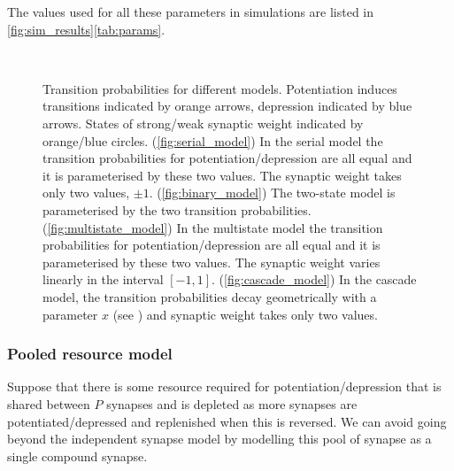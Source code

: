 \documentclass[10pt]{article}
\begin{document}
The values used for all these parameters in simulations are listed in \autoref{fig:sim_results}\ref{tab:params}.

\begin{figure}
 \begin{center}
 \parbox{0.8\linewidth}{%
 \begin{myenuma}
  \item{}\label{fig:serial_model}\hspace{0.5cm}
  \item{}\label{fig:binary_model}\hspace{0.5cm}\\[1cm]
  \item{}\label{fig:multistate_model}\hspace{0.5cm}
  \item{}\label{fig:cascade_model}
 \end{myenuma}
 }
 \end{center}
  \caption[Transition probabilities for different models]{Transition probabilities for different models.
  Potentiation induces transitions indicated by orange arrows, depression indicated by blue arrows.
  States of strong/weak synaptic weight indicated by orange/blue circles.
  (\ref{fig:serial_model}) In the serial model the transition probabilities for potentiation/depression are all equal and it is parameterised by these two values.
  The synaptic weight takes only two values, $\pm1$.
  (\ref{fig:binary_model}) The two-state model is parameterised by the two transition probabilities.
  (\ref{fig:multistate_model}) In the multistate model the transition probabilities for potentiation/depression are all equal and it is parameterised  by these two values.
  The synaptic weight varies linearly in the interval $[-1,1]$.
  (\ref{fig:cascade_model}) In the cascade model, the transition probabilities decay geometrically with a parameter $x$ (see \cite{Fusi2005cascade}) and synaptic weight takes only two values.
  } \label{fig:models}
\end{figure}

\subsubsection{Pooled resource model}\label{sec:pooledmodel}

Suppose that there is some resource required for potentiation/depression that is shared between $P$ synapses and is depleted as more synapses are potentiated/depressed and replenished when this is reversed.
We can avoid going beyond the independent synapse model by modelling this pool of synapse as a single compound synapse.
\end{document}
